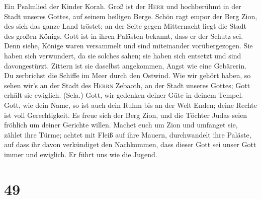  Ein Psalmlied der Kinder Korah.  Groß ist
der \textsc{Herr} und hochberühmt in der Stadt unseres Gottes, auf
seinem heiligen Berge.  Schön ragt empor der Berg Zion,
des sich das ganze Land tröstet; an der Seite gegen Mitternacht liegt
die Stadt des großen Königs.  Gott ist in ihren Palästen
bekannt, dass er der Schutz sei.  Denn siehe, Könige waren
versammelt und sind miteinander vorübergezogen.  Sie haben
sich verwundert, da sie solches sahen; sie haben sich entsetzt und sind
davongestürzt.  Zittern ist sie daselbst angekommen, Angst
wie eine Gebärerin.  Du zerbrichst die Schiffe im Meer
durch den Ostwind.  Wie wir gehört haben, so sehen wir's
an der Stadt des \textsc{Herrn} Zebaoth, an der Stadt unseres Gottes;
Gott erhält sie ewiglich. (Sela.)  Gott, wir gedenken
deiner Güte in deinem Tempel.  Gott, wie dein Name, so
ist auch dein Ruhm bis an der Welt Enden; deine Rechte ist voll
Gerechtigkeit.  Es freue sich der Berg Zion, und die
Töchter Judas seien fröhlich um deiner Gerichte willen. 
Machet euch um Zion und umfanget sie, zählet ihre Türme; 
achtet mit Fleiß auf ihre Mauern, durchwandelt ihre Paläste, auf dass
ihr davon verkündiget den Nachkommen,  dass dieser Gott
sei unser Gott immer und ewiglich. Er führt uns wie die Jugend.

\hypertarget{section-48}{%
\section{49}\label{section-48}}

